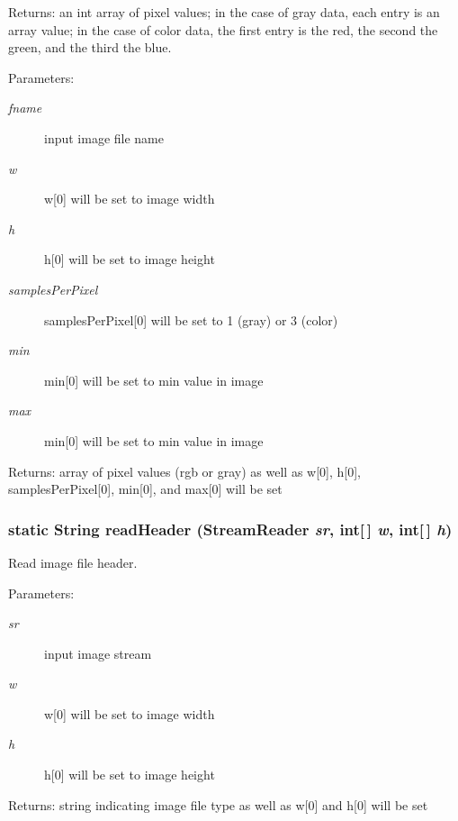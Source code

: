 \begin{Desc}
\item[Returns:]an int array of pixel values; in the case of gray data, each entry is an array value; in the case of color data, the first entry is the red, the second the green, and the third the blue.\end{Desc}
\begin{Desc}
\item[Parameters:]
\begin{description}
\item[{\em fname}]input image file name \item[{\em w}]w[0] will be set to image width \item[{\em h}]h[0] will be set to image height \item[{\em samples\-Per\-Pixel}]samples\-Per\-Pixel[0] will be set to 1 (gray) or 3 (color) \item[{\em min}]min[0] will be set to min value in image \item[{\em max}]min[0] will be set to min value in image\end{description}
\end{Desc}
\begin{Desc}
\item[Returns:]array of pixel values (rgb or gray) as well as w[0], h[0], samples\-Per\-Pixel[0], min[0], and max[0] will be set \end{Desc}
\subsubsection{\setlength{\rightskip}{0pt plus 5cm}static String read\-Header (Stream\-Reader {\em sr}, int[$\,$] {\em w}, int[$\,$] {\em h})\hspace{0.3cm}{\tt  [static, protected]}}\label{class_c_s_image_viewer_1_1pnm_helper_6767fccaf89d076447d11791292e67ae}


Read image file header. 

\begin{Desc}
\item[Parameters:]
\begin{description}
\item[{\em sr}]input image stream \item[{\em w}]w[0] will be set to image width \item[{\em h}]h[0] will be set to image height\end{description}
\end{Desc}
\begin{Desc}
\item[Returns:]string indicating image file type as well as w[0] and h[0] will be set \end{Desc}
